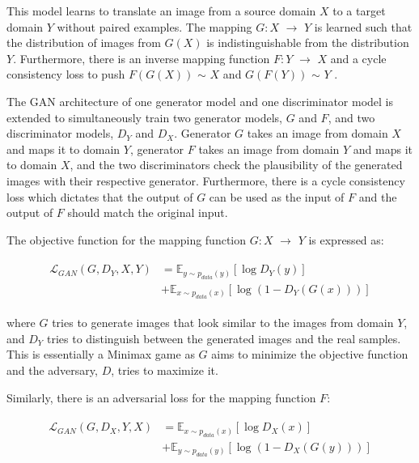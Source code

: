 \documentclass[conference]{IEEEtran}
\begin{document}
This model learns to translate an image from a source domain $X$ to a target domain $Y$ without paired examples. The mapping $G: X$ $\rightarrow$ $Y$ is learned such that the distribution of images from $G(X)$ is indistinguishable from the distribution $Y$. Furthermore, there is an inverse mapping function $F: Y$ $\rightarrow$ $X$ and a cycle consistency loss to push $F(G(X))$ $\sim$ $X$ and $G(F(Y))$ $\sim$ $Y$ \cite{zhu_unpaired_2018}.

The GAN architecture of one generator model and one discriminator model is extended to simultaneously train two generator models, $G$ and $F$, and two discriminator models, $D_Y$ and $D_X$. Generator $G$ takes an image from domain $X$ and maps it to domain $Y$, generator $F$ takes an image from domain $Y$ and maps it to domain $X$, and the two discriminators check the plausibility of the generated images with their respective generator. Furthermore, there is a cycle consistency loss which dictates that the output of $G$ can be used as the input of $F$ and the output of $F$ should match the original input. 

The objective function for the mapping function $G: X$ $\rightarrow$ $Y$ is expressed as: 

\begin{align}
    \begin{split}
        \mathcal{L}_{GAN}(G,D_Y,X,Y) &= \mathbb{E}_{y \sim p_{data}(y)} [\log D_Y(y)]  \\
        &+ \mathbb{E}_{x \sim p_{data}(x)} [\log(1-D_Y(G(x)))]
    \end{split}
\end{align}

where $G$ tries to generate images that look similar to the images from domain $Y$, and $D_Y$ tries to distinguish between the generated images and the real samples. This is essentially a Minimax game as $G$ aims to minimize the objective function and the adversary, $D$, tries to maximize it. 

Similarly, there is an adversarial loss for the mapping function $F$:

\begin{align}
    \begin{split}
        \mathcal{L}_{GAN}(G,D_X,Y,X) &= \mathbb{E}_{x \sim p_{data}(x)} [\log D_X(x)]  \\
        &+ \mathbb{E}_{y \sim p_{data}(y)} [\log(1-D_X(G(y)))]
    \end{split}
\end{align}
\end{document}
